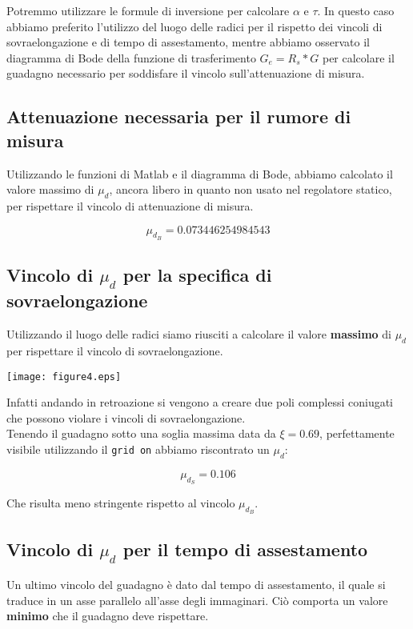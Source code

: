 \documentclass{article}
\begin{document}
Potremmo utilizzare le formule di inversione per calcolare $\alpha$ e $\tau$. In questo caso abbiamo preferito l'utilizzo del luogo delle radici per il rispetto dei vincoli di sovraelongazione e di tempo di assestamento, mentre abbiamo osservato il diagramma di Bode della funzione di trasferimento $G_e = R_s * G$ per calcolare il guadagno necessario per soddisfare il vincolo sull'attenuazione di misura.

\subsection{Attenuazione necessaria per il rumore di misura}

Utilizzando le funzioni di Matlab e il diagramma di Bode, abbiamo calcolato il valore massimo di $\mu_d$, ancora libero in quanto non usato nel regolatore statico, per rispettare il vincolo di attenuazione di misura.

$$
    \mu_{d_B}=0.073446254984543
$$

\subsection{Vincolo di $\mu_d$ per la specifica di sovraelongazione}

Utilizzando il luogo delle radici siamo riusciti a calcolare il valore \textbf{massimo} di $\mu_d$ per rispettare il vincolo di sovraelongazione.

\begin{center}
    \texttt{[image: figure4.eps]}
\end{center}
Infatti andando in retroazione si vengono a creare due poli complessi coniugati che possono violare i vincoli di sovraelongazione.\\
Tenendo il guadagno sotto una soglia massima data da $\xi=0.69$, perfettamente visibile utilizzando il \texttt{grid on} abbiamo riscontrato un $\mu_d$:

$$
    \mu_{d_S} = 0.106
$$

Che risulta meno stringente rispetto al vincolo $\mu_{d_B}$.

\subsection{Vincolo di $\mu_d$ per il tempo di assestamento}

Un ultimo vincolo del guadagno è dato dal tempo di assestamento, il quale si traduce in un asse parallelo all'asse degli immaginari. Ciò comporta un valore \textbf{minimo} che il guadagno deve rispettare.\\
\end{document}
